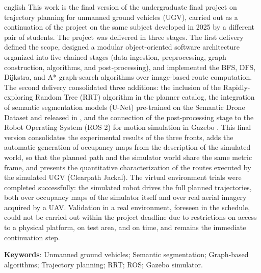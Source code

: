 \documentclass[
    12pt,
    openright,
    oneside,
    a4paper,
    english,
    brazil
]{abntex2}
\begin{document}
\begin{resumo}[Abstract]
\begin{otherlanguage*}{english}
This work is the final version of the undergraduate final project on trajectory planning for unmanned ground vehicles (UGV), carried out as a continuation of the project on the same subject developed in 2025 by a different pair of students. The project was delivered in three stages. The first delivery defined the scope, designed a modular object-oriented software architecture organized into five chained stages (data ingestion, preprocessing, graph construction, algorithms, and post-processing), and implemented the BFS, DFS, Dijkstra, and A* graph-search algorithms over image-based route computation. The second delivery consolidated three additions: the inclusion of the Rapidly-exploring Random Tree (RRT) algorithm in the planner catalog, the integration of semantic segmentation models (U-Net) pre-trained on the Semantic Drone Dataset \cite{drone_dataset} and released in \cite{junior2024_models}, and the connection of the post-processing stage to the Robot Operating System (ROS 2) \cite{quigley2009} for motion simulation in Gazebo \cite{koenig2004}. This final version consolidates the experimental results of the three fronts, adds the automatic generation of occupancy maps from the description of the simulated world, so that the planned path and the simulator world share the same metric frame, and presents the quantitative characterization of the routes executed by the simulated UGV (Clearpath Jackal). The virtual environment trials were completed successfully: the simulated robot drives the full planned trajectories, both over occupancy maps of the simulator itself and over real aerial imagery acquired by a UAV. Validation in a real environment, foreseen in the schedule, could not be carried out within the project deadline due to restrictions on access to a physical platform, on test area, and on time, and remains the immediate continuation step.

\textbf{Keywords}: Unmanned ground vehicles; Semantic segmentation; Graph-based algorithms; Trajectory planning; RRT; ROS; Gazebo simulator.
\end{otherlanguage*}
\end{resumo}

\listoffigures*
\cleardoublepage
\end{document}
